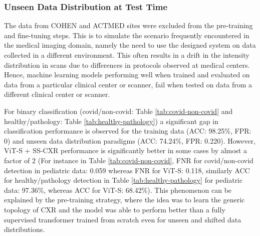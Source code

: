 \documentclass[10pt,journal,compsoc]{IEEEtran}
\begin{document}
\subsubsection{Unseen Data Distribution at Test Time}\label{testtime_drift}













The data from COHEN \cite{cohen} and ACTMED \cite{actmed} sites were excluded from the pre-training and fine-tuning steps. This is to simulate the scenario frequently encountered in the medical imaging domain, namely the need to use the designed system on data collected in a different environment. This often results in a drift in the intensity distribution in scans due to differences in protocols observed at medical centers. Hence, machine learning models performing well when trained and evaluated on data from a particular clinical center or scanner, fail when tested on data from a different clinical center or scanner.  

For binary classification (covid/non-covid: Table \ref{tab:covid-non-covid} and healthy/pathology: Table \ref{tab:healthy-pathology}) a significant gap in classification performance is observed for the training data (ACC: 98.25\%, FPR: 0) and unseen data distribution paradigms (ACC: 74.24\%, FPR: 0.220). However, ViT-S + SS-CXR performance is significantly better in some cases by almost a factor of 2 (For instance in Table \ref{tab:covid-non-covid}, FNR for covid/non-covid detection in pediatric data: 0.059 whereas FNR for ViT-S: 0.118, similarly ACC for healthy/pathology detection in Table \ref{tab:healthy-pathology} for pediatric data: 97.36\%, whereas ACC for ViT-S: 68.42\%). This phenomenon can be explained by the pre-training strategy, where the idea was to learn the generic topology of CXR and the model was able to perform better than a fully supervised transformer trained from scratch even for unseen and shifted data distributions. 
\end{document}
